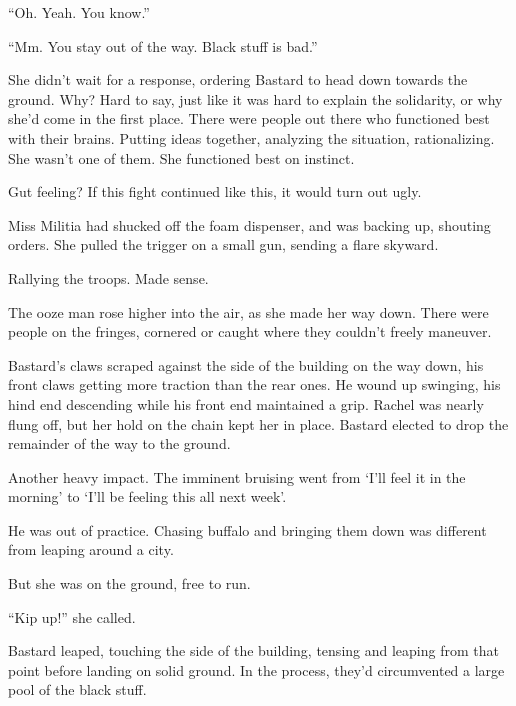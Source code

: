 ``Oh.  Yeah.  You know.''



``Mm.  You stay out of the way.  Black stuff is bad.''



She didn't wait for a response, ordering Bastard to head down towards the ground.  Why?  Hard to say, just like it was hard to explain the solidarity, or why she'd come in the first place.  There were people out there who functioned best with their brains.  Putting ideas together, analyzing the situation, rationalizing.  She wasn't one of them.  She functioned best on instinct.



Gut feeling?  If this fight continued like this, it would turn out ugly.



Miss Militia had shucked off the foam dispenser, and was backing up, shouting orders.  She pulled the trigger on a small gun, sending a flare skyward.



Rallying the troops.  Made sense.



The ooze man rose higher into the air, as she made her way down.  There were people on the fringes, cornered or caught where they couldn't freely maneuver.



Bastard's claws scraped against the side of the building on the way down, his front claws getting more traction than the rear ones.  He wound up swinging, his hind end descending while his front end maintained a grip.  Rachel was nearly flung off, but her hold on the chain kept her in place.  Bastard elected to drop the remainder of the way to the ground.



Another heavy impact.  The imminent bruising went from `I'll feel it in the morning' to `I'll be feeling this all next week'.



He was out of practice.  Chasing buffalo and bringing them down was different from leaping around a city.



But she was on the ground, free to run.



``Kip up!'' she called.



Bastard leaped, touching the side of the building, tensing and leaping from that point before landing on solid ground.  In the process, they'd circumvented a large pool of the black stuff.



